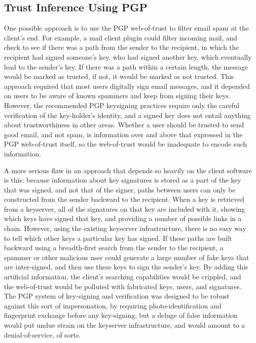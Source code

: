 \documentclass{acm_proc_article-sp}
\begin{document}
\subsection{Trust Inference Using PGP}
\label{earlierPGP}
One possible approach is to use the PGP web-of-trust to filter email spam at the client's end. For example, a mail client plugin could filter incoming mail, and check to see if there was a path from the sender to the recipient, in which the recipient had signed someone's key, who had signed another key, which eventually lead to the sender's key. If there was a path within a certain length, the message would be marked as trusted, if not, it would be marked as not trusted. This approach required that most users digitally sign email messages, and it depended on users to be aware of known spammers and keep from signing their keys. However, the recommended PGP keysigning practices require only the careful verification of the key-holder's identity, and a signed key does not entail anything about trustworthiness in other areas.  Whether a user should be trusted to send good email, and not spam, is information over and above that expressed in the PGP web-of-trust itself, so the web-of-trust would be inadequate to encode such information.

A more serious flaw in an approach that depends so heavily on the client software is this:  because information about key signatures is stored as a part of the key that was signed, and not that of the signer, paths between users can only be constructed from the sender backward to the recipient. When a key is retrieved from a keyserver, all of the signatures on that key are included with it, showing which keys have signed that key, and providing a number of possible links in a chain. However, using the existing keyserver infrastructure, there is no easy way to tell which other keys a particular key has signed. If these paths are built backward using a breadth-first search from the sender to the recipient, a spammer or other malicious user could generate a large number of fake keys that are inter-signed, and then use these keys to sign the sender's key. By adding this artificial information, the client's searching capabilities would be crippled, and the web-of-trust would be polluted with fabricated keys, users, and signatures. The PGP system of key-signing and verification was designed to be robust against this sort of impersonation, by requiring photo-identification and fingerprint exchange before any key-signing, but a deluge of false information would put undue strain on the keyserver infrastructure, and would amount to a denial-of-service, of sorts.
\end{document}
